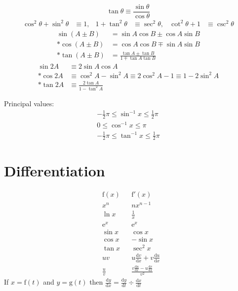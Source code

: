 \documentclass[a4paper]{article}
\begin{document}
\begin{equation}
    \tan{\theta} \equiv \frac{\sin{\theta}}{\cos{\theta}}
\end{equation}
\begin{align}
    \cos^2{\theta} + \sin^2{\theta} &\equiv 1,  &  1+\tan^2{\theta} &\equiv \sec^2{\theta},  &  \cot^2{\theta}+1 &\equiv \csc^2{\theta}
\end{align}
\begin{align}
    \sin{(A \pm B)} &= \sin A \cos B \pm \cos A \sin B \\*
    \cos{(A \pm B)} &= \cos A \cos B \mp \sin A \sin B \\*
    \tan{(A \pm B)} &= \frac{\tan A \pm \tan B}{1 \mp \tan A \tan B}
\end{align}
\begin{align}
    \sin{2A} &\equiv 2\sin A \cos A \\*
    \cos{2A} &\equiv \cos^2{A} - \sin^2{A} \equiv 2 \cos^2{A}-1 \equiv 1-2\sin^2{A} \\*
    \tan{2A} &\equiv \frac{2 \tan A}{1 - \tan^2{A}}
\end{align}

Principal values:
\begin{gather}
    -\frac{1}{2} \pi \leq \sin^{-1}{x} \leq \frac{1}{2} \pi \\
    0 \leq \cos^{-1}{x} \leq \pi \\
    -\frac{1}{2} \pi \leq \tan^{-1}{x} \leq \frac{1}{2} \pi
\end{gather}

\section{Differentiation}
\begin{align}
    &\mathrm{f}(x)  &  &\mathrm{f}'(x) \nonumber \\
    &x^n            &  &nx^{n-1} \\
    &\ln{x}         &  &{\textstyle\frac{1}{x}} \\
    &\mathrm{e}^x   &  &\mathrm{e}^x \\
    &\sin x         &  &\cos x \\
    &\cos x         &  &-\sin x \\
    &\tan x         &  &\sec^2 x \\
    &uv             &  &{\textstyle u\frac{\mathrm{d}v}{\mathrm{d}x}+v\frac{\mathrm{d}u}{\mathrm{d}x}} \\
    &\frac{u}{v}    &  &\frac{v\frac{\mathrm{d}u}{\mathrm{d}x}-u\frac{\mathrm{d}v}{\mathrm{d}x}}{v^2}
\end{align}
If \(x = \mathrm{f}(t)\) and \(y = \mathrm{g}(t)\) then \(\frac{\mathrm{d}y}{\mathrm{d}x} = \frac{\mathrm{d}y}{\mathrm{d}t} \div \frac{\mathrm{d}x}{\mathrm{d}t}\)
\end{document}
